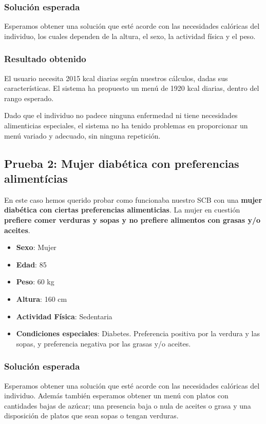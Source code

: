\documentclass[11]{article}
\begin{document}
\subsubsection{Solución esperada}
Esperamos obtener una solución que esté acorde con las necesidades calóricas del individuo, los cuales dependen de la altura, el sexo, la actividad física y el peso.

\subsubsection{Resultado obtenido}
El usuario necesita 2015 kcal diarias según nuestros cálculos, dadas sus características. El sistema ha propuesto un menú de 1920 kcal diarias, dentro del rango esperado.

Dado que el individuo no padece ninguna enfermedad ni tiene necesidades alimenticias especiales, el sistema no ha tenido problemas en proporcionar un menú variado y adecuado, sin ninguna repetición.

\subsection{Prueba 2: Mujer diabética con preferencias alimentícias}
En este caso hemos querido probar como funcionaba nuestro SCB con una \textbf{mujer diabética con ciertas preferencias alimenticias}. La mujer en cuestión \textbf{prefiere comer verduras y sopas y no prefiere alimentos con grasas y/o aceites}.  

\begin{itemize}
\item \textbf{Sexo}: Mujer
\item \textbf{Edad}: 85
\item \textbf{Peso}: 60 kg
\item \textbf{Altura}: 160 cm
\item \textbf{Actividad Física}: Sedentaria
\item \textbf{Condiciones especiales}: Diabetes. Preferencia positiva por la verdura y las sopas, y preferencia negativa por las grasas y/o aceites.
\end{itemize}

\subsubsection{Solución esperada}
Esperamos obtener una solución que esté acorde con las necesidades calóricas del individuo. Además también esperamos obtener un menú con platos con cantidades bajas de azúcar; una presencia baja o nula de aceites o grasa y una disposición de platos que sean sopas o tengan verduras.
\end{document}
